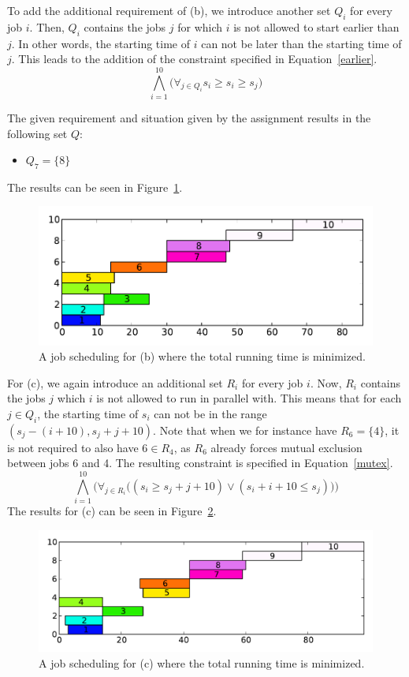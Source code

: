 To add the additional requirement of (b), we introduce another set $Q_i$ for every job $i$. Then, $Q_i$ contains the jobs $j$ for which $i$ is not allowed to start earlier than $j$. In other words, the starting time of $i$ can not be later than the starting time of $j$. This leads to the addition of the constraint specified in Equation~\ref{earlier}.
\begin{equation}
    \label{earlier}
    \bigwedge^{10}_{i=1}\big(\forall_{j\in Q_i} s_i \geq s_i \geq s_j \big)
\end{equation}

The given requirement and situation given by the assignment results in the following set $Q$:
\begin{itemize}
    \item $Q_7 = \{8\}$
\end{itemize}
The results can be seen in Figure~\ref{fig:3b}.
\begin{figure}[H]
    \centering
    \includegraphics[width=\columnwidth]{3/b_out.pdf}
    \caption{A job scheduling for (b) where the total running time is minimized.}
    \label{fig:3b}
\end{figure}

For (c), we again introduce an additional set $R_i$ for every job $i$. Now, $R_i$ contains the jobs $j$ which $i$ is not allowed to run in parallel with. This means that for each $j \in Q_i$, the starting time of $s_i$ can not be in the range $(s_j - (i + 10), s_j + j + 10)$. Note that when we for instance have $R_6 = \{4\}$, it is not required to also have $6 \in R_4$, as $R_6$ already forces mutual exclusion between jobs 6 and 4. The resulting constraint is specified in Equation~\ref{mutex}.
\begin{equation}
    \label{mutex}
    \bigwedge^{10}_{i=1}\bigg(\forall_{j \in R_i}\big((s_i \geq s_j + j + 10) \vee (s_i + i + 10 \leq s_j)\big)\bigg)
\end{equation}
The results for (c) can be seen in Figure~\ref{fig:3c}.
\begin{figure}[H]
    \centering
    \includegraphics[width=\columnwidth]{3/c_out.pdf}
    \caption{A job scheduling for (c) where the total running time is minimized.}
    \label{fig:3c}
\end{figure}
